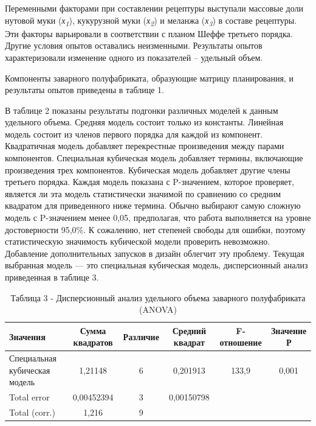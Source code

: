 \begin{multicols}{2}
Переменными факторами при составлении рецептуры выступали массовые доли
нутовой муки (\emph{х\textsubscript{1}}), кукурузной муки
(\emph{х\textsubscript{2}}) и меланжа (\emph{х\textsubscript{3}}) в
составе рецептуры. Эти факторы варьировали в соответствии с планом Шеффе
третьего порядка. Другие условия опытов оставались неизменными.
Результаты опытов характеризовали изменение одного из показателей --
удельный объем.

Компоненты заварного полуфабриката, образующие матрицу планирования, и
результаты опытов приведены в таблице 1.

В таблице 2 показаны результаты подгонки различных моделей к данным
удельного объема. Средняя модель состоит только из константы. Линейная
модель состоит из членов первого порядка для каждой из компонент.
Квадратичная модель добавляет перекрестные произведения между парами
компонентов. Специальная кубическая модель добавляет термины, включающие
произведения трех компонентов. Кубическая модель добавляет другие члены
третьего порядка. Каждая модель показана с P-значением, которое
проверяет, является ли эта модель статистически значимой по сравнению со
средним квадратом для приведенного ниже термина. Обычно выбирают самую
сложную модель с P-значением менее 0,05, предполагая, что работа
выполняется на уровне достоверности 95,0\%. К сожалению, нет степеней
свободы для ошибки, поэтому статистическую значимость кубической модели
проверить невозможно. Добавление дополнительных запусков в дизайн
облегчит эту проблему. Текущая выбранная модель --- это специальная
кубическая модель, дисперсионный анализ приведенная в таблице 3.
\end{multicols}

\begin{table}[H]
\caption*{Таблица 3 - Дисперсионный анализ удельного объема заварного полуфабриката (ANOVA)}
\centering
\begin{tabular}{|l|c|c|c|c|c|}
\hline
Значения                      & Сумма квадратов & Различие & Средний квадрат & F-отношение & Значение Р \\ \hline
\begin{minipage}{2.5cm}Специальная кубическая модель\end{minipage} & 1,21148         & 6        & 0,201913        & 133,9       & 0,001      \\ \hline
Total error                   & 0,00452394      & 3        & 0,00150798      &             &            \\ \hline
Total (corr.)                 & 1,216           & 9        &                 &             &            \\ \hline
\end{tabular}
\end{table}

